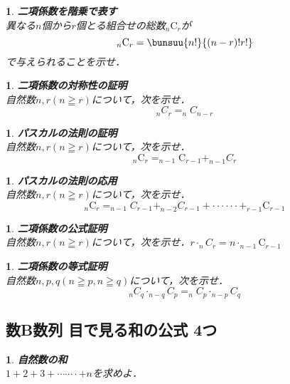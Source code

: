 \documentclass[10pt,
fleqn,
dvipdfmx,
uplatex
]{jsarticle}
\newtheorem{question}[Question]{}
\begin{document}
\begin{question}{\bf\boldmath 二項係数を階乗で表す}\\
異なる$n$個から$r$個とる組合せの総数$_n\text{C}_r$が
\[_n\text{C}_r=\bunsuu{{n!}}{{\left(n-r\right)!r!}}\]
で与えられることを示せ．
\end{question}



\begin{question}{\bf\boldmath 二項係数の対称性の証明}\\
自然数$n, r\left(n\geqq r\right)$について，次を示せ．
\[_nC_r=_nC_{n-r}\]
\end{question}



\begin{question}{\bf\boldmath パスカルの法則の証明}\\
自然数$n, r\left(n\geqq r\right)$について，次を示せ．
\[_n\text{C}_r=_{n-1}\text{C}_{r-1}+_{n-1}C_r\]
\end{question}



\begin{question}{\bf\boldmath パスカルの法則の応用}\\
自然数$n, r\left(n\geqq r\right)$について，次を示せ．
\[_n\text{C}_r=_{n-1}C_{r-1}+_{n-2}C_{r-1}+\cdot \cdot \cdot \cdot \cdot \cdot +_{r-1}\text{C}_{r-1}\]
\end{question}



\begin{question}{\bf\boldmath 二項係数の公式証明}\\
自然数$n, r\left(n\geqq r\right)$について，次を示せ．$r\cdot _nC_r=n\cdot _{n-1}\text{C}_{r-1}$
\end{question}



\begin{question}{\bf\boldmath 二項係数の等式証明}\\
自然数$n, p, q\left(n\geqq p,n\geqq q\right)$について，次を示せ．
\[_nC_q\cdot _{n-q}C_p=_nC_p\cdot _{n-p}C_q\]
\end{question}

\subsection{数B数列 目で見る和の公式 4つ}



\begin{question}{\bf\boldmath 自然数の和}\\
$1+2+3+\cdots \cdots \cdot +n$を求めよ．
\end{question}
\end{document}
